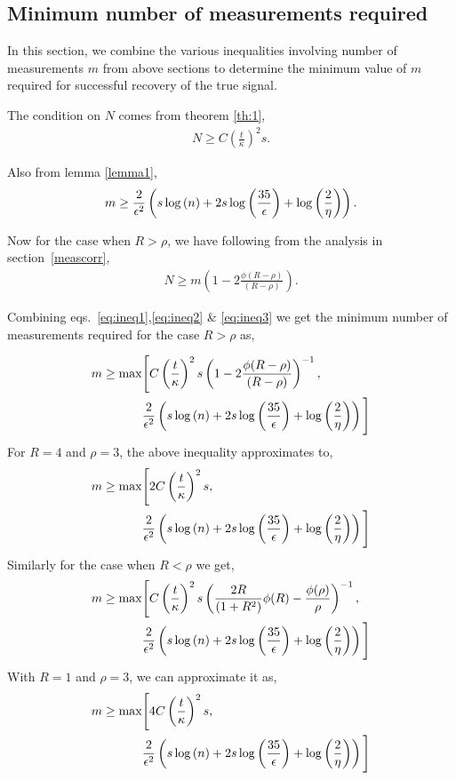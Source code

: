 \subsection{Minimum number of measurements required}
In this section, we combine the various inequalities involving number of measurements $m$ from above sections to determine the minimum value of $m$ required for successful recovery of the true signal.

The condition on $N$ comes from theorem \ref{th:1},
\begin{align}
N \geq C\left(\frac{t}{\kappa}\right)^2s.
\label{eq:ineq1}
\end{align}

Also from lemma \ref{lemma1},
\begin{align}
m \geq \frac{2}{\eps^2}\left(s\log{(n)} + 2s\log{\left(\frac{35}{\eps}\right)}+\log{\left(\frac{2}{\eta}\right)}\right).
\label{eq:ineq2}
\end{align}

Now for the case when $R> \rho$, we have following from the analysis in section~\ref{meascorr},
\begin{align}
N \geq m \left(1-2\frac{\phi(R-\rho)}{(R-\rho)} \right).
\label{eq:ineq3}
\end{align}

Combining eqs.~\ref{eq:ineq1},\ref{eq:ineq2} \& \ref{eq:ineq3} we get the minimum number of measurements required for the case $R > \rho$ as,

\begin{align}
m \geq \max & \Bigg[ C\left(\frac{t}{\kappa}\right)^2s \left(1-2\frac{\phi(R-\rho)}{(R-\rho)} \right)^{-1}, \nonumber \\ 
& \frac{2}{\eps^2}\left(s\log{(n)} + 2s\log{\left(\frac{35}{\eps}\right)}+\log{\left(\frac{2}{\eta}\right)}\right)\Bigg]
\label{eq:ineq4}
\end{align}
For $R=4$ and $\rho =3$, the above inequality approximates to,
\begin{align*}
m \geq \max & \Bigg[ 2C\left(\frac{t}{\kappa}\right)^2s, \nonumber \\ 
& \frac{2}{\epsilon^2}\left(s\log{(n)} + 2s\log{\left(\frac{35}{\epsilon}\right)}+\log{\left(\frac{2}{\eta}\right)}\right)\Bigg]
\end{align*}
Similarly for the case when $R<\rho$ we get,
\begin{align}
m \geq \max &  \Bigg[C\left(\frac{t}{\kappa}\right)^2s \left(\frac{2R}{(1+R^2)} \phi(R) - \frac{\phi(\rho)}{\rho}\right)^{-1}, \nonumber \\ 
& \frac{2}{\eps^2}\left(s\log{(n)} + 2s\log{\left(\frac{35}{\eps}\right)}+\log{\left(\frac{2}{\eta}\right)}\right) \Bigg]
\label{eq:ineq5}
\end{align}
With $R=1$ and $\rho =3$, we can approximate it as,
\begin{align*}
m \geq \max &  \Bigg[4C\left(\frac{t}{\kappa}\right)^2s, \nonumber \\ 
& \frac{2}{\epsilon^2}\left(s\log{(n)} + 2s\log{\left(\frac{35}{\epsilon}\right)}+\log{\left(\frac{2}{\eta}\right)}\right) \Bigg]
\end{align*}